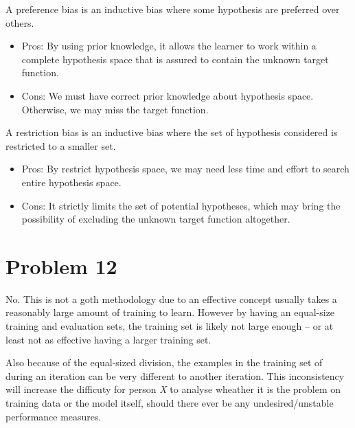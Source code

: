 \documentclass[12pt]{article}
\begin{document}
A preference bias is an inductive bias where some hypothesis are preferred over others.

\begin{itemize}
    \item Pros: By using prior knowledge, it allows the learner to work within a complete hypothesis space that is assured to contain the unknown target function.
    \item Cons: We must have correct prior knowledge about hypothesis space. Otherwise, we may miss the target function.
\end{itemize}



\noindent A restriction bias is an inductive bias where the set of hypothesis considered is restricted to a smaller set.

\begin{itemize}
    \item Pros: By restrict hypothesis space, we may need less time and effort to search entire hypothesis space.
    \item Cons: It strictly limits the set of potential hypotheses, which may bring the possibility of excluding the unknown target function altogether.
\end{itemize}




\section{Problem 12}

No. This is not a goth methodology due to an effective concept usually takes a reasonably large amount of training to learn. However by having an equal-size training and evaluation sets, the training set is likely not large enough -- or at least not as effective having a larger training set.

Also because of the equal-sized division, the examples in the training set of during an iteration can be very different to another iteration. This inconsistency will increase the difficuty for person \textit{X} to analyse wheather it is the problem on training data or the model itself, should there ever be any undesired/unstable performance measures.

\end{document}
